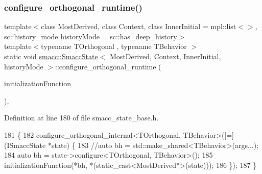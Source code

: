 \subsubsection{\texorpdfstring{configure\+\_\+orthogonal\+\_\+runtime()}{configure\_orthogonal\_runtime()}\hspace{0.1cm}{\footnotesize\ttfamily [1/2]}}
{\footnotesize\ttfamily template$<$class Most\+Derived, class Context, class Inner\+Initial = mpl\+::list$<$$>$, sc\+::history\+\_\+mode history\+Mode = sc\+::has\+\_\+deep\+\_\+history$>$ \\
template$<$typename T\+Orthogonal , typename T\+Behavior $>$ \\
static void \hyperlink{classsmacc_1_1SmaccState}{smacc\+::\+Smacc\+State}$<$ Most\+Derived, Context, Inner\+Initial, history\+Mode $>$\+::configure\+\_\+orthogonal\+\_\+runtime (\begin{DoxyParamCaption}\item[{std\+::function$<$ void(T\+Behavior \&bh, Most\+Derived \&)$>$}]{initialization\+Function }\end{DoxyParamCaption})\hspace{0.3cm}{\ttfamily [inline]}, {\ttfamily [static]}}



Definition at line 180 of file smacc\+\_\+state\+\_\+base.\+h.


\begin{DoxyCode}
181     \{
182       configure\_orthogonal\_internal<TOrthogonal, TBehavior>([=](ISmaccState *state) \{
183         \textcolor{comment}{//auto bh = std::make\_shared<TBehavior>(args...);}
184         \textcolor{keyword}{auto} bh = state->configure<TOrthogonal, TBehavior>();
185         initializationFunction(*bh, *(static\_cast<MostDerived*>(state)));
186       \});
187     \}
\end{DoxyCode}
\mbox{\label{classsmacc_1_1SmaccState_afe48d925910d9c691324ac3159a1bf10}} 
